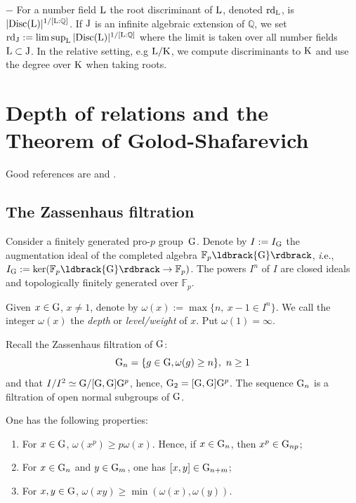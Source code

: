 \documentclass[12pt,a4paper,twoside,english]{smfart}
\def\Q{{\mathbb Q}}
\def\fq{{\mathbb F}}
\def\G{{\rm G}}
\def\J{{\rm J}}
\def\K{{\rm K}}
\def\L{{\rm L}}
\def\rd{{\rm rd}}
\def\ker{{\rm ker}}
\begin{document}
$-$ 
For a number field $\L$ the root discriminant of $\L$, denoted $\rd_{\L}$, is  $|{\rm Disc}(\L)|^{1/[\L:\Q]}$. If $\J$ is an infinite algebraic extension of $\Q$,
we set $\rd_{\J}:= \limsup_\L |{\rm Disc}(\L)|^{1/[\L:\Q]}$ where the limit is taken over all number fields $\L \subset \J$. In the relative setting, e.g $\L/\K$,
we compute discriminants to $\K$ and use the degree over $\K$ when taking roots.
\color{black}


\medskip


 



\section{Depth of relations and the Theorem of Golod-Shafarevich} Good references are \cite[Appendice]{Lazard} and \cite{Koch}.

\subsection{The Zassenhaus filtration}
Consider a finitely generated pro-$p$ group~$\G$. 
Denote by $I:=I_\G$ the augmentation ideal of the completed
algebra $\fq_p\ldbrack \G \rdbrack$, {\emph i.e.}, $I_\G:= \ker(\fq_p \ldbrack \G \rdbrack \rightarrow \fq_p)$. The powers $I^n$ of $I$ are closed ideals and 
topologically
 finitely generated over $\fq_p$.




\begin{defi} Given  $x\in \G$, $x\neq 1$, denote by $\omega(x):=\max\{n, \ x-1 \in I^n\}$. We call the integer $\omega(x)$  the {\it depth} or
{\it level/weight}  of $x$. Put $\omega(1)=\infty$.%
\end{defi}


Recall the Zassenhaus filtration of $\G$:
$$ \G_n=\{g\in \G, \omega(g) \geq n \}, \ n \geq 1$$ and
 that $I/I^2 \simeq \G/[\G,\G]\G^p$, hence, $\G_2=[\G,\G]\G^p$.
The sequence $\G_n$ is a filtration of open normal subgroups of $\G$.



\begin{prop} \label{prop:proprietes-omega} One has the  following properties:
\begin{enumerate}
\item[$(i)$] For $x \in \G$,  $\omega(x^p) \geq p \omega(x)$. Hence, if $x\in \G_n$,  then $x^p \in \G_{np}$;
\item[$(ii)$] For $x\in \G_n$ and $y\in \G_m$, one has  $[x,y] \in \G_{n+m}$;
\item[$(iii)$] For $x,y \in \G$, $\omega(xy) \geq \min (\omega(x),\omega(y))$.
\end{enumerate}
\end{prop}
\end{document}
